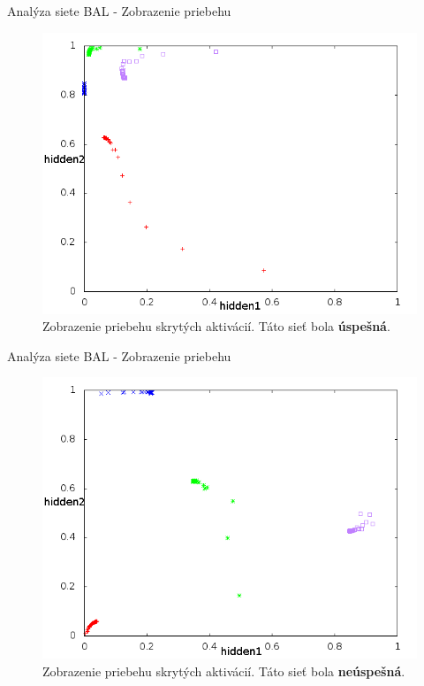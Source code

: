 \documentclass[xcolor=dvipsnames]{beamer}
\begin{document}
\begin{frame}{Analýza siete BAL - Zobrazenie priebehu}
  \begin{figure}[h!]  
    \centering
    \includegraphics[scale=0.4]{img/left_top.png}
    \caption{{\small Zobrazenie priebehu skrytých aktivácií. Táto sieť bola {\bf úspešná}.} }
  \end{figure} 
\end{frame}

\begin{frame}{Analýza siete BAL - Zobrazenie priebehu}
  \begin{figure}[h!]  
    \centering
    \includegraphics[scale=0.4]{img/tazisko.png}
    \caption{{\small Zobrazenie priebehu skrytých aktivácií. Táto sieť bola {\bf neúspešná}.} }
  \end{figure} 
\end{frame}
\end{document}
